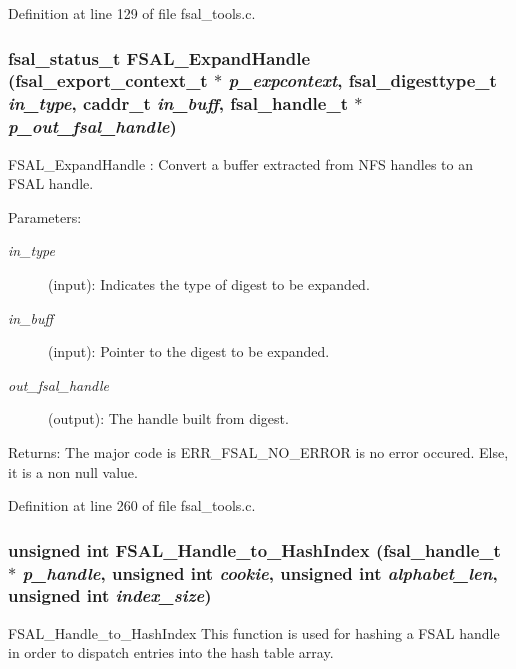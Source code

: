 Definition at line 129 of file fsal\_\-tools.c.
\subsubsection{\setlength{\rightskip}{0pt plus 5cm}fsal\_\-status\_\-t FSAL\_\-Expand\-Handle (fsal\_\-export\_\-context\_\-t $\ast$ {\em p\_\-expcontext}, fsal\_\-digesttype\_\-t {\em in\_\-type}, caddr\_\-t {\em in\_\-buff}, fsal\_\-handle\_\-t $\ast$ {\em p\_\-out\_\-fsal\_\-handle})}\label{fsal__tools_8c_a7}


FSAL\_\-Expand\-Handle : Convert a buffer extracted from NFS handles to an FSAL handle.

\begin{Desc}
\item[Parameters:]
\begin{description}
\item[{\em in\_\-type}](input): Indicates the type of digest to be expanded. \item[{\em in\_\-buff}](input): Pointer to the digest to be expanded. \item[{\em out\_\-fsal\_\-handle}](output): The handle built from digest.\end{description}
\end{Desc}
\begin{Desc}
\item[Returns:]The major code is ERR\_\-FSAL\_\-NO\_\-ERROR is no error occured. Else, it is a non null value. \end{Desc}


Definition at line 260 of file fsal\_\-tools.c.
\subsubsection{\setlength{\rightskip}{0pt plus 5cm}unsigned int FSAL\_\-Handle\_\-to\_\-Hash\-Index (fsal\_\-handle\_\-t $\ast$ {\em p\_\-handle}, unsigned int {\em cookie}, unsigned int {\em alphabet\_\-len}, unsigned int {\em index\_\-size})}\label{fsal__tools_8c_a4}


FSAL\_\-Handle\_\-to\_\-Hash\-Index This function is used for hashing a FSAL handle in order to dispatch entries into the hash table array.

